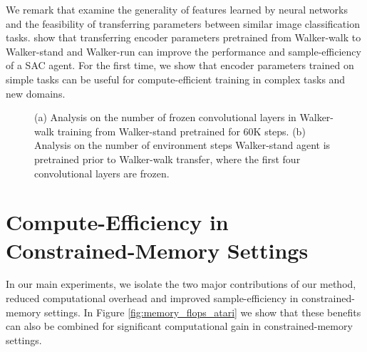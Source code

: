 \documentclass{article}
\begin{document}
We remark that \citet{yosinski2014transferable} examine the generality of features learned by neural networks and the feasibility of transferring parameters between similar image classification tasks. \citet{yarats2019improving} show that transferring encoder parameters pretrained from Walker-walk to Walker-stand and Walker-run can improve the performance and sample-efficiency of a SAC agent. For the first time, we show that encoder parameters trained on simple tasks can be useful for compute-efficient training in complex tasks and new domains. 



\begin{figure} [t] \centering
{} 
\caption{(a) Analysis on the number of frozen convolutional layers in Walker-walk training from Walker-stand pretrained for 60K steps. (b) Analysis on the number of environment steps Walker-stand agent is pretrained prior to Walker-walk transfer, where the first four convolutional layers are frozen.} \label{fig:transfer_dmc_ablation}
\end{figure}














\section{Compute-Efficiency in Constrained-Memory Settings} \label{appendix:additional_figures1}
In our main experiments, we isolate the two major contributions of our method, reduced computational overhead and improved sample-efficiency in constrained-memory settings. In Figure \ref{fig:memory_flops_atari} we show that these benefits can also be combined for significant computational gain in constrained-memory settings. 
\end{document}
